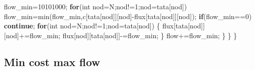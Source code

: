 \documentclass[10pt,]{article}
\newenvironment{Shaded}{}{}
\newcommand{\KeywordTok}[1]{\textcolor[rgb]{0.00,0.44,0.13}{\textbf{{#1}}}}
\newcommand{\DataTypeTok}[1]{\textcolor[rgb]{0.56,0.13,0.00}{{#1}}}
\newcommand{\DecValTok}[1]{\textcolor[rgb]{0.25,0.63,0.44}{{#1}}}
\newcommand{\NormalTok}[1]{{#1}}
\begin{document}
\begin{Shaded}
\begin{Highlighting}[]
      \NormalTok{flow_min=}\DecValTok{10101000}\NormalTok{;}
      \KeywordTok{for}\NormalTok{(}\DataTypeTok{int} \NormalTok{nod=N;nod!=}\DecValTok{1}\NormalTok{;nod=tata[nod])}
        \NormalTok{flow_min=min(flow_min,c[tata[nod]][nod]-flux[tata[nod]][nod]);}
      \KeywordTok{if}\NormalTok{(flow_min==}\DecValTok{0}\NormalTok{)}
        \KeywordTok{continue}\NormalTok{;}
      \KeywordTok{for}\NormalTok{(}\DataTypeTok{int} \NormalTok{nod=N;nod!=}\DecValTok{1}\NormalTok{;nod=tata[nod]) \{}
        \NormalTok{flux[tata[nod]][nod]+=flow_min;}
        \NormalTok{flux[nod][tata[nod]]-=flow_min;}
      \NormalTok{\}}
      \NormalTok{flow+=flow_min;}
    \NormalTok{\}}
  \NormalTok{\}}
\NormalTok{\}}
\end{Highlighting}
\end{Shaded}

\subsection{Min cost max flow}
\end{document}
